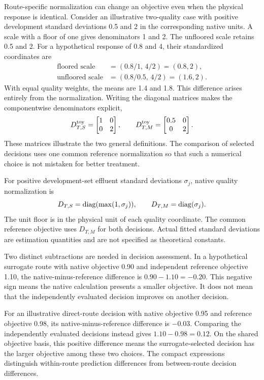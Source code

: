 Route-specific normalization can change an objective even when the physical response is identical. Consider an illustrative two-quality case with positive development standard deviations 0.5 and 2 in the corresponding native units. A scale with a floor of one gives denominators 1 and 2. The unfloored scale retains 0.5 and 2. For a hypothetical response of 0.8 and 4, their standardized coordinates are
\[
\begin{aligned}
\text{floored scale}&=(0.8/1,\,4/2)=(0.8,2),\\
\text{unfloored scale}&=(0.8/0.5,\,4/2)=(1.6,2).
\end{aligned}
\]
With equal quality weights, the means are 1.4 and 1.8. This difference arises entirely from the normalization. Writing the diagonal matrices makes the componentwise denominators explicit,
\[
D_{T,S}^{\rm toy}=\begin{bmatrix}1&0\\0&2\end{bmatrix},\qquad
D_{T,M}^{\rm toy}=\begin{bmatrix}0.5&0\\0&2\end{bmatrix}.
\]
These matrices illustrate the two general definitions. The comparison of selected decisions uses one common reference normalization so that such a numerical choice is not mistaken for better treatment.

For positive development-set effluent standard deviations $\sigma_j$, native quality normalization is
\begin{equation}
\equationname{Route-specific water-quality objective scales}
D_{T,S}=\operatorname{diag}(\max(1,\sigma_j)),\qquad
D_{T,M}=\operatorname{diag}(\sigma_j).
\label{eq:plant_route_normalization}
\end{equation}
The unit floor is in the physical unit of each quality coordinate. The common reference objective uses $D_{T,M}$ for both decisions. Actual fitted standard deviations are estimation quantities and are not specified as theoretical constants.

Two distinct subtractions are needed in decision assessment. In a hypothetical surrogate route with native objective 0.90 and independent reference objective 1.10, the native-minus-reference difference is $0.90-1.10=-0.20$. This negative sign means the native calculation presents a smaller objective. It does not mean that the independently evaluated decision improves on another decision.

For an illustrative direct-route decision with native objective 0.95 and reference objective 0.98, its native-minus-reference difference is $-0.03$. Comparing the independently evaluated decisions instead gives $1.10-0.98=0.12$. On the shared objective basis, this positive difference means the surrogate-selected decision has the larger objective among these two choices. The compact expressions distinguish within-route prediction differences from between-route decision differences.

